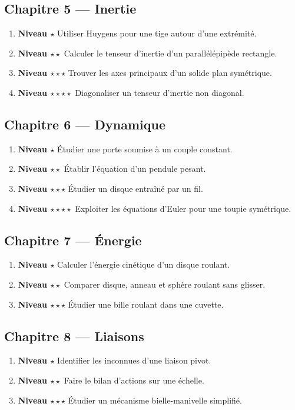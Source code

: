 \documentclass[11pt,a4paper]{article}
\newcommand{\niveau}[1]{\textbf{Niveau #1}}
\begin{document}
\subsection*{Chapitre 5 — Inertie}
\begin{enumerate}
  \item \niveau{$\star$} Utiliser Huygens pour une tige autour d'une extrémité.
  \item \niveau{$\star\star$} Calculer le tenseur d'inertie d'un parallélépipède rectangle.
  \item \niveau{$\star\star\star$} Trouver les axes principaux d'un solide plan symétrique.
  \item \niveau{$\star\star\star\star$} Diagonaliser un tenseur d'inertie non diagonal.
\end{enumerate}

\subsection*{Chapitre 6 — Dynamique}
\begin{enumerate}
  \item \niveau{$\star$} Étudier une porte soumise à un couple constant.
  \item \niveau{$\star\star$} Établir l'équation d'un pendule pesant.
  \item \niveau{$\star\star\star$} Étudier un disque entraîné par un fil.
  \item \niveau{$\star\star\star\star$} Exploiter les équations d'Euler pour une toupie symétrique.
\end{enumerate}

\subsection*{Chapitre 7 — Énergie}
\begin{enumerate}
  \item \niveau{$\star$} Calculer l'énergie cinétique d'un disque roulant.
  \item \niveau{$\star\star$} Comparer disque, anneau et sphère roulant sans glisser.
  \item \niveau{$\star\star\star$} Étudier une bille roulant dans une cuvette.
\end{enumerate}

\subsection*{Chapitre 8 — Liaisons}
\begin{enumerate}
  \item \niveau{$\star$} Identifier les inconnues d'une liaison pivot.
  \item \niveau{$\star\star$} Faire le bilan d'actions sur une échelle.
  \item \niveau{$\star\star\star$} Étudier un mécanisme bielle-manivelle simplifié.
\end{enumerate}
\end{document}
